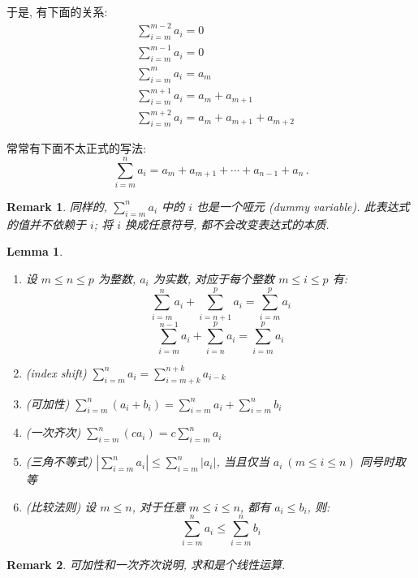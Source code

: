 \documentclass[UTF8]{ctexart}
\theoremstyle{mystyle}
\newtheorem{lemma}{Lemma}[section]
\theoremstyle{myremark}
\newtheorem*{remark}{Remark}
\theoremstyle{plain}
\begin{document}
于是, 有下面的关系:
\begin{align*}
    & \sum_{i = m}^{m - 2} a_i = 0 \\
    & \sum_{i = m}^{m - 1} a_i = 0 \\
    & \sum_{i = m}^{m} a_i = a_m \\
    & \sum_{i = m}^{m + 1} a_i = a_m + a_{m + 1} \\
    & \sum_{i = m}^{m + 2} a_i = a_m + a_{m + 1} + a_{m + 2}
\end{align*}

常常有下面不太正式的写法:
\[ \sum_{i = m}^{n} a_i = a_m + a_{m + 1} + \cdots + a_{n - 1} + a_{n} \,.\]

\begin{remark}
    同样的, $ \displaystyle \sum_{i = m}^{n} a_i $ 中的 $ i $ 也是一个哑元 (dummy variable). 此表达式的值并不依赖于 $ i $; 将 $ i $ 换成任意符号, 都不会改变表达式的本质.
\end{remark}


\begin{lemma}
    \begin{enumerate}
        \item 设 $ m \leqslant n \leqslant p $ 为整数, $ a_i $ 为实数, 对应于每个整数 $ m \leqslant i \leqslant p $ 有: \[ \sum_{i = m}^{n} a_i + \sum_{i = n + 1}^{p} a_i = \sum_{i = m}^{p} a_i \] \[ \sum_{i = m}^{n - 1} a_i + \sum_{i = n}^{p} a_i = \sum_{i = m}^{p} a_i \]
        \item (index shift) $\displaystyle \sum_{i = m}^{n} a_i = \sum_{i = m + k}^{n + k} a_{i - k} $
        \item (可加性) $\displaystyle \sum_{i = m}^{n} (a_i + b_i) = \sum_{i = m}^{n} a_i + \sum_{i = m}^{n} b_i $
        \item (一次齐次) $\displaystyle \sum_{i = m}^{n} (c a_i) = c \sum_{i = m}^{n} a_i $
        \item (三角不等式) $\displaystyle \left| \sum_{i = m}^{n} a_i \right| \leqslant \sum_{i = m}^{n} |a_i| $, 当且仅当 $ a_i \ (m \leqslant i \leqslant n) $ 同号时取等
        \item (比较法则) 设 $ m \leqslant n $, 对于任意 $ m \leqslant i \leqslant n $, 都有 $ a_i \leqslant b_i $, 则: \[ \sum_{i = m}^{n} a_i \leqslant \sum_{i = m}^{n} b_i \]
    \end{enumerate}
\end{lemma}

\begin{remark}
    可加性和一次齐次说明, 求和是个线性运算.
\end{remark}
\end{document}

